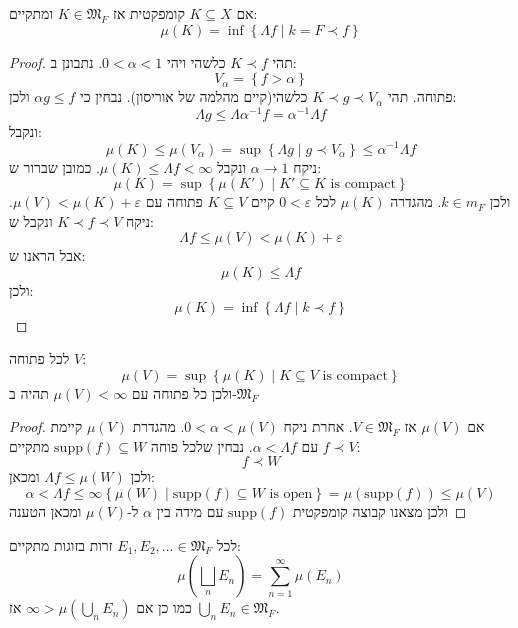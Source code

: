 \documentclass{tstextbook}
\begin{document}
\begin{lemma}[שלב 2]
אם \(K\subseteq X\) קומפקטית אז \(K \in \mathfrak{M}_{F}\) ומתקיים:
$$\mu(K)=\inf \left\{  \Lambda f\mid k=F\prec f  \right\}$$

\end{lemma}
\begin{proof}
תהי \(K\prec f\) כלשהי ויהי \(0<\alpha < 1\). נתבונן ב:
$$V_{\alpha}=\left\{  f > \alpha  \right\}$$
פתוחה. תהי \(K\prec g\prec V_{\alpha}\) כלשהי(קיים מהלמה של אוריסון). נבחין כי \(\alpha g \leq f\) ולכן:
$$\Lambda g \leq \Lambda \alpha ^{-1} f = \alpha ^{-1} \Lambda f$$
ונקבל:
$$\mu(K)\leq \mu\left( V_{\alpha} \right)=\sup \left\{  \Lambda g \mid g \prec V_{\alpha}  \right\}\leq \alpha ^{-1} \Lambda f$$
ניקח \(\alpha \to 1\) ונקבל \(\mu(K)\leq \Lambda f < \infty\). כמובן שברור ש:
$$\mu(K)=\sup \left\{  \mu(K')\mid K' \subseteq K \text{ is compact}  \right\}$$
ולכן \(k \in m_{F}\). מהגדרה \(\mu(K)\) לכל \(0<\varepsilon\) קיים \(K\subseteq V\) פתוחה עם \(\mu(V)<\mu(K)+\varepsilon\). ניקח \(K \prec f \prec V\) ונקבל ש:
$$\Lambda f \leq \mu(V) < \mu(K)+\varepsilon$$
אבל הראנו ש:
$$\mu(K)\leq \Lambda f$$
ולכן:
$$\mu(K)=\inf \left\{  \Lambda f \mid k \prec f  \right\}$$

\end{proof}
\begin{lemma}[שלב 3]
לכל פתוחה \(V\):
$$\mu(V)=\sup \left\{  \mu(K) \mid K \subseteq V \text{ is compact}  \right\}$$
ולכן כל פתוחה עם \(\mu(V)< \infty\) תהיה ב-\(\mathfrak{M}_{F}\)

\end{lemma}
\begin{proof}
אם \(\mu(V)\) אז \(V \in \mathfrak{M}_{F}\). אחרת ניקח \(0<\alpha< \mu(V)\). מהגדרת \(\mu(V)\) קיימת \(f\prec V\) עם \(\alpha < \Lambda f\). נבחין שלכל פוחה \(\text{supp}(f)\subseteq W\) מתקיים:
$$f\prec W$$
ולכן \(\Lambda f\leq \mu(W)\) ומכאן:
$$\alpha< \Lambda f \leq \infty \left\{  \mu(W)\mid \text{supp}(f) \subseteq W \text{ is open}  \right\}=\mu\left( \text{supp}(f) \right)\leq \mu(V)$$
ולכן מצאנו קבוצה קומפקטית \(\text{supp}(f)\) עם מידה בין \(\alpha\) ל-\(\mu(V)\) ומכאן הטענה

\end{proof}
\begin{lemma}[שלב 4]
לכל \(E_{1}, E_{2}, \dots \in \mathfrak{M}_{F}\) זרות בזוגות מתקיים:
$$\mu\left( \bigsqcup_{n} E_{n} \right)=\sum_{n=1}^{\infty} \mu(E_{n})$$
כמו כן אם \(\infty> \mu\left( \bigcup_{n}E_{n} \right)\) אז \(\bigcup_{n}E_{n}\in \mathfrak{M}_{F}\).

\end{lemma}
\end{document}
